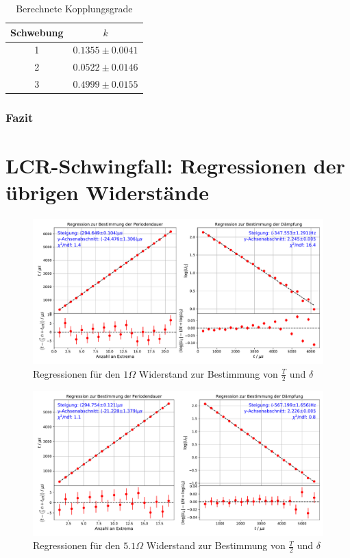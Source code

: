\documentclass[a4paper, 12pt]{scrartcl}
\begin{document}
\begin{table}[H]
\centering
\begin{tabular}{c|c}
Schwebung & $k$ \\
\hline
1 & $0.1355 \pm 0.0041$ \\
2 & $0.0522 \pm 0.0146$ \\
3 & $0.4999 \pm 0.0155$
\end{tabular}
\caption{Berechnete Kopplungsgrade}
\label{tab:kopplung}
\end{table}


\subsubsection{Fazit}

\newpage
\appendix
\section{LCR-Schwingfall: Regressionen der übrigen Widerstände}\label{app:reg}
\begin{figure}[H]
\centering
\includegraphics[width=\textwidth]{plots/reg_schwingung1.pdf}
\caption{Regressionen für den $1\Omega$ Widerstand zur Bestimmung von $\frac{T}{2}$ und $\delta$}
\end{figure}
\begin{figure}[H]
\centering
\includegraphics[width=\textwidth]{plots/reg_schwingung2.pdf}
\caption{Regressionen für den $5.1\Omega$ Widerstand zur Bestimmung von $\frac{T}{2}$ und $\delta$}
\end{figure}
\end{document}
